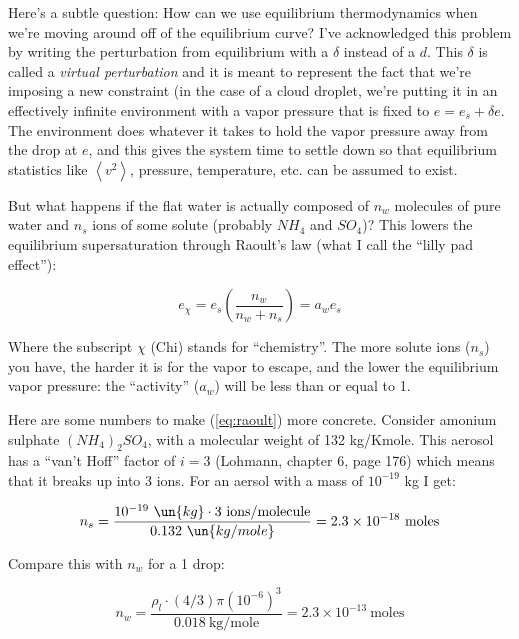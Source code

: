 \documentclass[12pt]{article}
\begin{document}
Here's a subtle question: How can we use equilibrium thermodynamics
when we're moving around off of the equilibrium curve?  I've acknowledged
this problem by writing the perturbation from equilibrium with
a $\delta$ instead of a $d$.  This $\delta$ is called a 
\textit{virtual perturbation} and it is meant to represent the fact
that we're imposing a new constraint (in the case of a cloud droplet,
we're putting it in an effectively infinite environment with a 
vapor pressure that is fixed to $e=e_s + \delta e$.  The environment
does whatever it takes to hold the vapor pressure away from the
drop at $e$, and this gives the system time to settle down
so that equilibrium statistics like $\left < v^2 \right >$, pressure,
temperature, etc. can be assumed to exist.


But what happens if the flat water is actually composed of $n_w$
molecules of pure water and $n_s$ ions of some solute (probably
$NH_4$ and $SO_4$)?  This lowers the equilibrium supersaturation through
Raoult's law (what I call the ``lilly pad effect''):

\begin{equation}
  \label{eq:raoult}
e_\chi = e_s \left ( \frac{n_w}{n_w + n_s} \right ) = a_w e_s  
\end{equation}

\noindent
Where the subscript $\chi$ (Chi) stands for ``chemistry''.  The more
solute ions ($n_s$) you have, the harder it is for the vapor to
escape, and the lower the equilibrium vapor pressure: the ``activity''
($a_w$) will be less than or equal to 1.

Here are some numbers to make (\ref{eq:raoult}) more concrete.  Consider
amonium sulphate $(NH_4)_2 SO_4$, with a molecular weight of
132 kg/Kmole.  This aerosol has a ``van't Hoff'' factor of $i=3$
(Lohmann, chapter 6, page 176) which means that it breaks up into 3 ions.  For
an aersol with a mass of $10^{-19}$ kg I get:

\begin{equation}
  \label{eq:aero}
  n_s = \frac{10^{-19}\ \un{kg} \cdot 3\ \mbox{ions/molecule}}%
     {0.132\ \un{kg/mole}} = 2.3 \times 10^{-18}\ \mbox{moles}
\end{equation}

Compare this with $n_w$ for a 1 \mum drop:

\begin{equation}
  \label{eq:water}
  n_w = \frac{\rho_l \cdot (4/3) \pi (10^{-6})^3}{0.018\ \mbox{kg/mole}}
  = 2.3 \times 10^{-13}\ \mbox{moles}
\end{equation}
\end{document}
